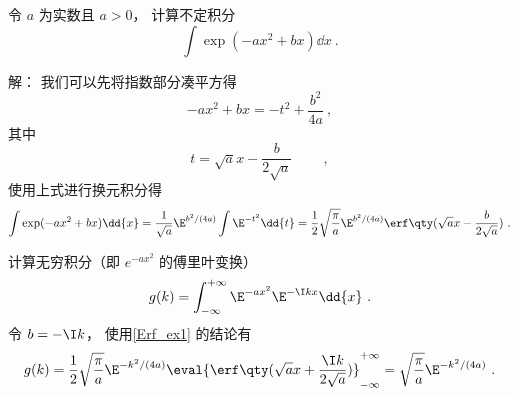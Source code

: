\begin{example}{}\label{Erf_ex1}
令 $a$ 为实数且 $a > 0$， 计算不定积分
\begin{equation}
\int \exp(-ax^2 + bx) \dd{x}~.
\end{equation}

解： 我们可以先将指数部分凑平方得
\begin{equation}
-ax^2 + bx = -t^2 + \frac{b^2}{4a}~,
\end{equation}
其中
\begin{equation}
t = \sqrt{a} x - \frac{b}{2\sqrt{a}} \qquad~,
\end{equation}
使用上式进行换元积分得
\begin{equation}
\int \exp(-ax^2 + bx) \dd{x} = \frac{1}{\sqrt{a}} \E^{{b^2}/(4a)} \int \E^{-t^2} \dd{t}
= \frac12 \sqrt{\frac{\pi}{a}} \E^{{b^2}/(4a)} \erf\qty(\sqrt{a} x - \frac{b}{2\sqrt{a}})~.
\end{equation}
\end{example}

\begin{example}{}\label{Erf_ex2}
计算无穷积分（即 $e^{-ax^2}$ 的傅里叶变换）
\begin{equation}
g(k) = \int_{-\infty}^{+\infty} \E^{-a x^2} \E^{-\I kx} \dd{x}~.
\end{equation}
令 $b = -\I k$， 使用\autoref{Erf_ex1} 的结论有
\begin{equation}\label{Erf_eq2}
g(k) = \frac12 \sqrt{\frac{\pi}{a}} \E^{-{k^2}/(4a)} \eval{\erf\qty(\sqrt{a} x + \frac{\I k}{2\sqrt{a}})}_{-\infty}^{+\infty} = \sqrt{\frac{\pi}{a}} \E^{-{k^2}/(4a)}~.
\end{equation}
\end{example}
